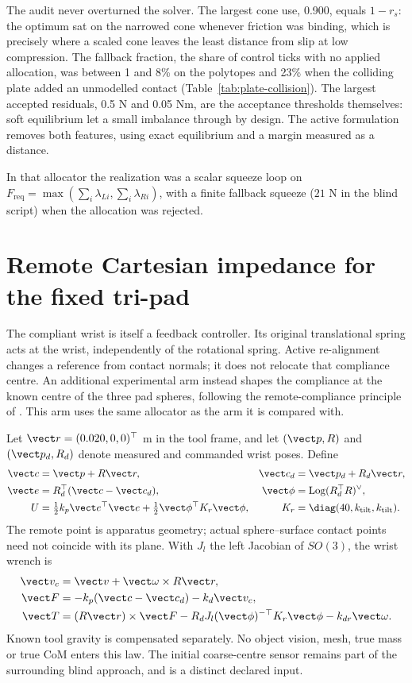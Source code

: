 The audit never overturned the solver. The largest cone use, 0.900, equals $1-r_s$: the optimum sat on the narrowed cone whenever friction was binding, which is precisely where a scaled cone leaves the least distance from slip at low compression. The fallback fraction, the share of control ticks with no applied allocation, was between 1 and 8\% on the polytopes and 23\% when the colliding plate added an unmodelled contact (Table~\ref{tab:plate-collision}). The largest accepted residuals, 0.5 N and 0.05 Nm, are the acceptance thresholds themselves: soft equilibrium let a small imbalance through by design. The active formulation removes both features, using exact equilibrium and a margin measured as a distance.

In that allocator the realization was a scalar squeeze loop on $F_{\mathrm{req}}=\max(\sum_i\lambda_{Li},\sum_i\lambda_{Ri})$, with a finite fallback squeeze ($21$ N in the blind script) when the allocation was rejected.

\section{Remote Cartesian impedance for the fixed tri-pad}
\label{sec:remote-impedance}

The compliant wrist is itself a feedback controller. Its original translational spring acts at the wrist, independently of the rotational spring. Active re-alignment changes a reference from contact normals; it does not relocate that compliance centre. An additional experimental arm instead shapes the compliance at the known centre of the three pad spheres, following the remote-compliance principle of \citet{whitney1982}. This arm uses the same allocator as the arm it is compared with.

Let $\vect r=(0.020,0,0)^\top$ m in the tool frame, and let $(\vect p,R)$ and $(\vect p_d,R_d)$ denote measured and commanded wrist poses. Define
\begin{align}
\vect c&=\vect p+R\vect r, & \vect c_d&=\vect p_d+R_d\vect r,\\
\vect e&=R_d^\top(\vect c-\vect c_d), & \vect\phi&=\operatorname{Log}(R_d^\top R)^\vee,\\
U&=\tfrac12 k_p\vect e^\top\vect e+
\tfrac12\vect\phi^\top K_r\vect\phi,
&K_r&=\diag(40,k_{\mathrm{tilt}},k_{\mathrm{tilt}}).
\end{align}
The remote point is apparatus geometry; actual sphere--surface contact points need not coincide with its plane. With $J_l$ the left Jacobian of $SO(3)$, the wrist wrench is
\begin{align}
\vect v_c&=\vect v+\vect\omega\times R\vect r,\\
\vect F&=-k_p(\vect c-\vect c_d)-k_d\vect v_c,\\
\vect T&=(R\vect r)\times\vect F
-R_dJ_l(\vect\phi)^{-\top}K_r\vect\phi-k_{dr}\vect\omega.
\label{eq:rcc-wrench}
\end{align}
Known tool gravity is compensated separately. No object vision, mesh, true mass or true CoM enters this law. The initial coarse-centre sensor remains part of the surrounding blind approach, and is a distinct declared input.

